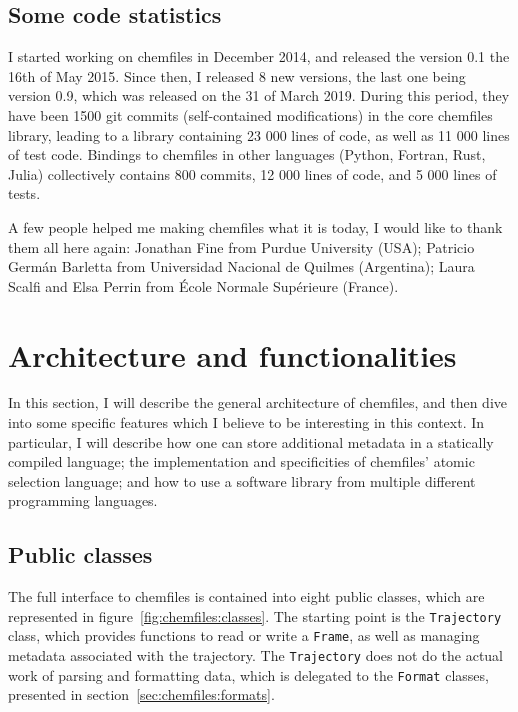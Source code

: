 \documentclass[thesis]{subfiles}
\begin{document}
\subsection{Some code statistics}

I started working on chemfiles in December 2014, and released the version 0.1
the 16th of May 2015. Since then, I released 8 new versions, the last one being
version 0.9, which was released on the 31 of March 2019. During this period,
they have been 1500 git commits (self-contained modifications) in the core \cxx
chemfiles library, leading to a library containing 23 000 lines of code, as well
as 11 000 lines of test code. Bindings to chemfiles in other languages (Python,
Fortran, Rust, Julia) collectively contains 800 commits, 12 000 lines of code,
and 5 000 lines of tests.

A few people helped me making chemfiles what it is today, I would like to thank
them all here again: Jonathan Fine from Purdue University (USA); Patricio Germán
Barletta from Universidad Nacional de Quilmes (Argentina); Laura Scalfi and Elsa
Perrin from École Normale Supérieure (France).

\section{Architecture and functionalities}

In this section, I will describe the general architecture of chemfiles, and then
dive into some specific features which I believe to be interesting in this
context. In particular, I will describe how one can store additional metadata in
a statically compiled language; the implementation and specificities of chemfiles'
atomic selection language; and how to use a software library from multiple
different programming languages.

\subsection{Public classes}

The full interface to chemfiles is contained into eight public classes, which
are represented in figure~\ref{fig:chemfiles:classes}. The starting point is the
\texttt{Trajectory} class, which provides functions to read or write a
\texttt{Frame}, as well as managing metadata associated with the trajectory. The
\texttt{Trajectory} does not do the actual work of parsing and formatting data,
which is delegated to the \texttt{Format} classes, presented in
section~\ref{sec:chemfiles:formats}.
\end{document}
